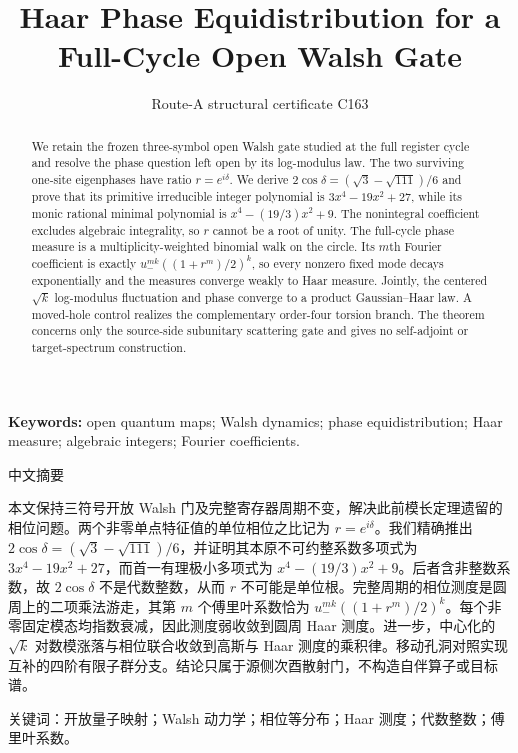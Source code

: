 \documentclass[10pt]{article}
\title{\vspace{-1.8em}Haar Phase Equidistribution for a Full-Cycle Open Walsh Gate}
\author{Route-A structural certificate C163}
\date{}
\begin{document}
\maketitle
\begin{abstract}
We retain the frozen three-symbol open Walsh gate studied at the full register
cycle and resolve the phase question left open by its log-modulus law.  The
two surviving one-site eigenphases have ratio $r=e^{i\delta}$.  We derive
$2\cos\delta=(\sqrt3-\sqrt{111})/6$ and prove that its primitive irreducible
integer polynomial is $3x^4-19x^2+27$, while its monic rational minimal
polynomial is $x^4-(19/3)x^2+9$.  The nonintegral coefficient excludes
algebraic integrality, so $r$ cannot be a root of unity.
The full-cycle phase measure is a multiplicity-weighted binomial walk on the
circle.  Its $m$th Fourier coefficient is exactly
$u_-^{mk}((1+r^m)/2)^k$, so every nonzero fixed mode decays exponentially and
the measures converge weakly to Haar measure.  Jointly, the centered
$\sqrt{k}$ log-modulus fluctuation and phase converge to a product
Gaussian--Haar law.  A moved-hole control realizes the complementary
order-four torsion branch.  The theorem concerns only the source-side
subunitary scattering gate and gives no self-adjoint or target-spectrum
construction.
\end{abstract}
\noindent\textbf{Keywords:} open quantum maps; Walsh dynamics; phase
equidistribution; Haar measure; algebraic integers; Fourier coefficients.

\begin{otherlanguage}{chinese-simplified}
\begin{center}{\large 中文摘要}\end{center}
\begin{sloppypar}
本文保持三符号开放 \foreignlanguage{english}{Walsh} 门及完整寄存器周期不变，解决此前模长定理遗留的相位问题。两个非零单点特征值的单位相位之比记为
$r=e^{i\delta}$。我们精确推出
$2\cos\delta=(\sqrt3-\sqrt{111})/6$，并证明其本原不可约整系数多项式为
$3x^4-19x^2+27$，而首一有理极小多项式为 $x^4-(19/3)x^2+9$。后者含非整数系数，故 $2\cos\delta$ 不是代数整数，从而
$r$ 不可能是单位根。完整周期的相位测度是圆周上的二项乘法游走，其第 $m$ 个傅里叶系数恰为
$u_-^{mk}((1+r^m)/2)^k$。每个非零固定模态均指数衰减，因此测度弱收敛到圆周
\foreignlanguage{english}{Haar} 测度。进一步，中心化的 $\sqrt{k}$ 对数模涨落与相位联合收敛到高斯与 \foreignlanguage{english}{Haar}
测度的乘积律。移动孔洞对照实现互补的四阶有限子群分支。结论只属于源侧次酉散射门，不构造自伴算子或目标谱。
\end{sloppypar}
\noindent 关键词：开放量子映射；\foreignlanguage{english}{Walsh} 动力学；相位等分布；\foreignlanguage{english}{Haar} 测度；代数整数；傅里叶系数。
\end{otherlanguage}
\end{document}
